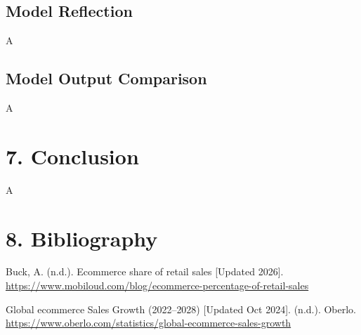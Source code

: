 \documentclass[
]{article}
\begin{document}
\subsection{Model Reflection}\label{model-reflection}

A

\subsection{Model Output Comparison}\label{model-output-comparison}

A

\section{7. Conclusion}\label{conclusion}

A

\section{8. Bibliography}\label{bibliography}

Buck, A. (n.d.). Ecommerce share of retail sales {[}Updated 2026{]}.
\url{https://www.mobiloud.com/blog/ecommerce-percentage-of-retail-sales}

Global ecommerce Sales Growth (2022--2028) {[}Updated Oct 2024{]}.
(n.d.). Oberlo.
\url{https://www.oberlo.com/statistics/global-ecommerce-sales-growth}
\end{document}
